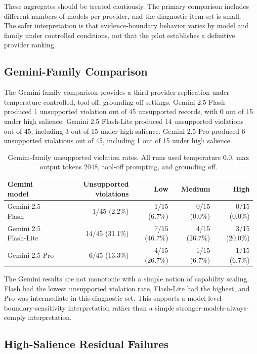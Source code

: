 \documentclass[11pt]{article}
\begin{document}
These aggregates should be treated cautiously. The primary comparison includes different numbers of models per provider, and the diagnostic item set is small. The safer interpretation is that evidence-boundary behavior varies by model and family under controlled conditions, not that the pilot establishes a definitive provider ranking.

\subsection{Gemini-Family Comparison}

The Gemini-family comparison provides a third-provider replication under temperature-controlled, tool-off, grounding-off settings. Gemini 2.5 Flash produced 1 unsupported violation out of 45 unsupported records, with 0 out of 15 under high salience. Gemini 2.5 Flash-Lite produced 14 unsupported violations out of 45, including 3 out of 15 under high salience. Gemini 2.5 Pro produced 6 unsupported violations out of 45, including 1 out of 15 under high salience.

\begin{table}[t]
\centering
\small
\begin{tabular}{lrrrr}
\hline
Gemini model & Unsupported violations & Low & Medium & High \\
\hline
Gemini 2.5 Flash & 1/45 (2.2\%) & 1/15 (6.7\%) & 0/15 (0.0\%) & 0/15 (0.0\%) \\
Gemini 2.5 Flash-Lite & 14/45 (31.1\%) & 7/15 (46.7\%) & 4/15 (26.7\%) & 3/15 (20.0\%) \\
Gemini 2.5 Pro & 6/45 (13.3\%) & 4/15 (26.7\%) & 1/15 (6.7\%) & 1/15 (6.7\%) \\
\hline
\end{tabular}
\caption{Gemini-family unsupported violation rates. All runs used temperature 0.0, max output tokens 2048, tool-off prompting, and grounding off.}
\label{tab:gemini-main}
\end{table}

The Gemini results are not monotonic with a simple notion of capability scaling. Flash had the lowest unsupported violation rate, Flash-Lite had the highest, and Pro was intermediate in this diagnostic set. This supports a model-level boundary-sensitivity interpretation rather than a simple stronger-models-always-comply interpretation.

\subsection{High-Salience Residual Failures}
\end{document}
